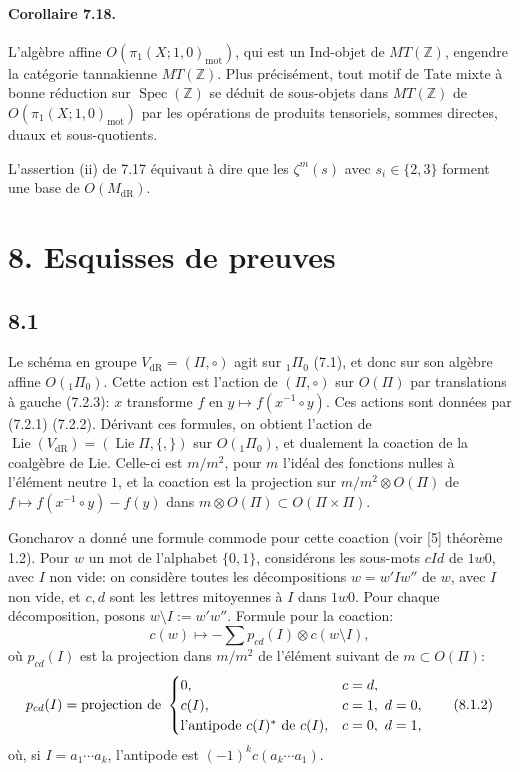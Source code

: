 \documentclass[10pt]{article}
\newcommand{\Z}{\mathbb Z}
\newcommand{\Spec}{\operatorname{Spec}}
\newcommand{\Lie}{\operatorname{Lie}}
\newcommand{\dR}{\mathrm{dR}}
\newcommand{\mot}{\mathrm{mot}}
\begin{document}
\paragraph{Corollaire 7.18.}
L'algèbre affine $O(\pi_1(X;1,0)_{\mot})$, qui est un Ind-objet de $MT(\Z)$, engendre la catégorie tannakienne $MT(\Z)$. Plus précisément, tout motif de Tate mixte à bonne réduction sur $\Spec(\Z)$ se déduit de sous-objets dans $MT(\Z)$ de $O(\pi_1(X;1,0)_{\mot})$ par les opérations de produits tensoriels, sommes directes, duaux et sous-quotients.

L'assertion (ii) de 7.17 équivaut à dire que les $\zeta^m(s)$ avec $s_i\in\{2,3\}$ forment une base de $O(M_{\dR})$.

\section*{8. Esquisses de preuves}

\subsection*{8.1}
Le schéma en groupe $V_{\dR}=(\Pi,\circ)$ agit sur ${}_1\Pi_0$ (7.1), et donc sur son algèbre affine $O({}_1\Pi_0)$. Cette action est l'action de $(\Pi,\circ)$ sur $O(\Pi)$ par translations à gauche (7.2.3): $x$ transforme $f$ en $y\mapsto f(x^{-1}\circ y)$. Ces actions sont données par (7.2.1) (7.2.2). Dérivant ces formules, on obtient l'action de $\Lie(V_{\dR})=(\Lie\Pi,\{,\})$ sur $O({}_1\Pi_0)$, et dualement la coaction de la coalgèbre de Lie. Celle-ci est $m/m^2$, pour $m$ l'idéal des fonctions nulles à l'élément neutre $1$, et la coaction est la projection sur $m/m^2\otimes O(\Pi)$ de $f\mapsto f(x^{-1}\circ y)-f(y)$ dans $m\otimes O(\Pi)\subset O(\Pi\times\Pi)$.

Goncharov a donné une formule commode pour cette coaction (voir [5] théorème 1.2). Pour $w$ un mot de l'alphabet $\{0,1\}$, considérons les sous-mots $cId$ de $1w0$, avec $I$ non vide: on considère toutes les décompositions $w=w'Iw''$ de $w$, avec $I$ non vide, et $c,d$ sont les lettres mitoyennes à $I$ dans $1w0$. Pour chaque décomposition, posons $w\setminus I:=w'w''$. Formule pour la coaction:
\begin{equation}
c(w)\longmapsto -\sum p_{cd}(I)\otimes c(w\setminus I),
\tag{8.1.1}
\end{equation}
où $p_{cd}(I)$ est la projection dans $m/m^2$ de l'élément suivant de $m\subset O(\Pi)$:
\begin{equation}
p_{cd}(I)=\hbox{projection de }\begin{cases}
0,& c=d,\\
c(I),& c=1,\ d=0,\\
\hbox{l'antipode }c(I)^*\hbox{ de }c(I),& c=0,\ d=1,
\end{cases}
\tag{8.1.2}
\end{equation}
où, si $I=a_1\cdots a_k$, l'antipode est $(-1)^kc(a_k\cdots a_1)$.
\end{document}
